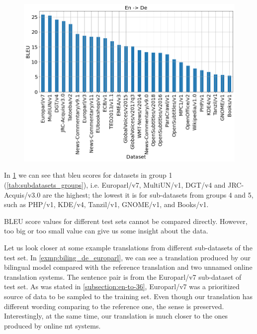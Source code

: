 \begin{figure}[h]
	\centering
	\includegraphics[width=0.9\columnwidth]{img/bilingual_en_de.png}
	\label{fig:bilingual_en_de}
\end{figure}

In \cref{fig:bilingual_en_de} we can see that \acrshort{bleu} scores
for datasets in group 1 (\cref{tab:subdatasets_groups}), i.e.
Europarl/v7, MultiUN/v1, DGT/v4 and JRC-Acquis/v3.0 are the highest;
the lowest it is for sub-datasets from groups 4 and 5, such as
PHP/v1, KDE/v4, Tanzil/v1, GNOME/v1, and Books/v1.

BLEU score values for different test sets cannot be compared directly.
However, too big or too small value can give us some insight about the
data.

Let us look closer at some example translations from different
sub-datasets of the  test set.
In \cref{exmp:biling_de_europarl}, we can see a translation produced
by our bilingual  model compared with the reference translation
and two unnamed online translation systems.
The sentence pair is from the Europarl/v7 sub-dataset of
 test set.
As was stated in \cref{subsection:en-to-36}, Europarl/v7 was a prioritized
source of data to be sampled to the training set.
Even though our translation has different wording comparing to the reference one,
the sense is preserved.
Interestingly, at the same time, our translation is much closer
to the ones produced by online \acrshort{mt} systems.

